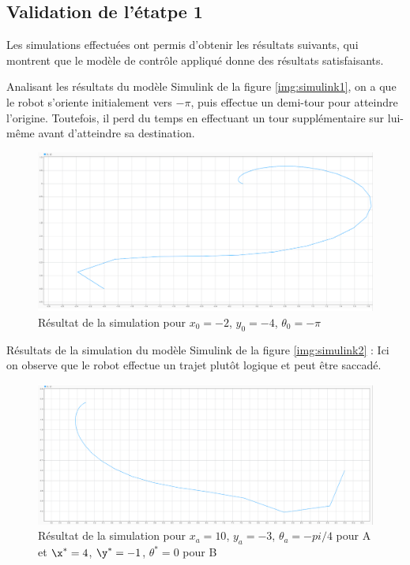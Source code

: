 \subsection{Validation de l'étatpe 1}

Les simulations effectuées ont permis d'obtenir les résultats suivants, qui montrent que le modèle de contrôle appliqué donne des résultats satisfaisants. 
 
 Analisant les résultats du modèle Simulink de la figure \ref{img:simulink1}, on a que le robot s'oriente initialement vers $-\pi$, puis effectue un demi-tour pour atteindre l'origine. Toutefois, il perd du temps en effectuant un tour supplémentaire sur lui-même avant d'atteindre sa destination.

\begin{figure}[!h]
    \centering
    \includegraphics[width=1.0\textwidth]{img/diagrams/5courbe_trajectoire.png} 
    \caption{Résultat de la simulation pour $x_0 = -2$, $y_0 = -4$, $\theta_0 = -\pi$}
    \label{img-abc_dq}
\end{figure}
\FloatBarrier

Résultats de la simulation du modèle Simulink de la figure \ref{img:simulink2} : Ici on observe que le robot effectue un trajet plutôt logique et peut être saccadé.

\begin{figure}[!h]
    \centering
    \includegraphics[width=1.0\textwidth]{img/diagrams/7.png} 
    \caption{Résultat de la simulation pour $x_a = 10$, $y_a = -3$, $\theta_a = -pi/4$ pour A et $\x^* = 4$, $\y^* = -1$, $\theta^* = 0$ pour B}
    \label{img-abc_dq}
\end{figure}

